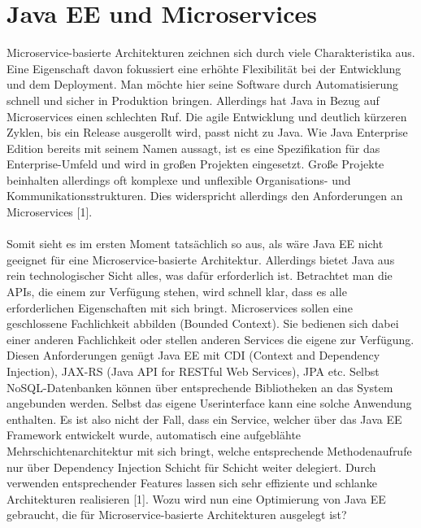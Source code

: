 \section{Java EE und Microservices}
Microservice-basierte Architekturen zeichnen sich durch viele Charakteristika aus. Eine Eigenschaft davon fokussiert eine erhöhte Flexibilität bei der Entwicklung und dem Deployment. Man möchte hier seine Software durch Automatisierung schnell und sicher in Produktion bringen. Allerdings hat Java in Bezug auf Microservices einen schlechten Ruf. Die agile Entwicklung und deutlich kürzeren Zyklen, bis ein Release ausgerollt wird, passt nicht zu Java. Wie Java Enterprise Edition bereits mit seinem Namen aussagt, ist es eine Spezifikation für das Enterprise-Umfeld und wird in großen Projekten eingesetzt. Große Projekte beinhalten allerdings oft komplexe und unflexible Organisations- und Kommunikationsstrukturen. Dies widerspricht allerdings den Anforderungen an Microservices [1]. \\ \\
Somit sieht es im ersten Moment tatsächlich so aus, als wäre Java EE nicht geeignet für eine Microservice-basierte Architektur. Allerdings bietet Java aus rein technologischer Sicht alles, was dafür erforderlich ist. Betrachtet man die APIs, die einem zur Verfügung stehen, wird schnell klar, dass es alle erforderlichen Eigenschaften mit sich bringt. Microservices sollen eine geschlossene Fachlichkeit abbilden (Bounded Context). Sie bedienen sich dabei einer anderen Fachlichkeit oder stellen anderen Services die eigene zur Verfügung. Diesen Anforderungen genügt Java EE mit CDI (Context and Dependency Injection), JAX-RS (Java API for RESTful Web Services), JPA etc. Selbst NoSQL-Datenbanken können über entsprechende Bibliotheken an das System angebunden werden. Selbst das eigene Userinterface kann eine solche Anwendung enthalten. Es ist also nicht der Fall, dass ein Service, welcher über das Java EE Framework entwickelt wurde, automatisch eine aufgeblähte Mehrschichtenarchitektur mit sich bringt, welche entsprechende Methodenaufrufe nur über Dependency Injection Schicht für Schicht weiter delegiert. Durch verwenden entsprechender Features lassen sich sehr effiziente und schlanke Architekturen realisieren [1]. Wozu wird nun eine Optimierung von Java EE gebraucht, die für Microservice-basierte Architekturen ausgelegt ist?


